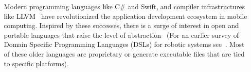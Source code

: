 Modern programming languages like C\# and Swift, and   compiler infrastructures like LLVM~\cite{llvm} have revolutionized the application development ecosystem in mobile computing.
Inspired by these successes, there is a surge of interest in open and portable languages that raise the level of abstraction~\cite{Buzzlanguage,Bohrer:2018:VVC:3192366.3192406,reactlang,williams2003model} (For an earlier survey of Domain Specific Programming Languages (DSLs) for robotic systems see~\cite{Nordmann2014}. Most of these older languages are proprietary or generate executable files that are tied to specific platforms).


%
%
%
%

